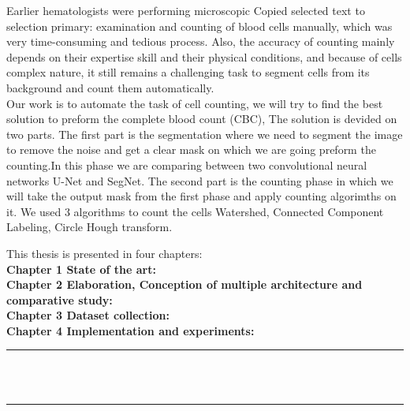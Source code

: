 \documentclass[12pt]{report}
\begin{document}
Earlier hematologists were performing microscopic Copied selected text to selection primary: examination and counting of blood cells manually, which  was very time-consuming and tedious process. Also, the accuracy of counting mainly depends on their expertise skill and their physical conditions, and because of cells complex nature, it still remains a challenging task to segment cells from its background and count them automatically.\\
Our work is to automate the task of cell counting, we will  try to find the best solution to preform the complete blood count (CBC), The solution is devided on two parts.
The first part is the segmentation where we need to segment the image to remove the noise and get a clear mask on which we are going preform the counting.In this phase we are comparing between two convolutional neural networks U-Net and SegNet.
The second part is the counting phase in which we will take  the output mask from the first phase and apply counting algorimths on it. We used 3 algorithms to count the cells Watershed, Connected Component Labeling, Circle Hough transform.

This thesis is presented in four chapters:\\

\textbf{Chapter 1 State of the art:}\\
\textbf{Chapter 2 Elaboration, Conception of multiple architecture and comparative study:}\\
\textbf{Chapter 3 Dataset collection:}\\
\textbf{Chapter 4 Implementation and experiments:}\\

\newpage

\vspace*{\fill}
\begin{center}
    {\color{Black} \rule{\linewidth}{1.2mm} }\\
\vspace{0.25in}
{\centering{}}
\vspace{0.35in}\\
    {\color{Black} \rule{\linewidth}{1.2mm} }
\end{center}
\vspace*{\fill}
\setcounter{section}{0}

\newpage
\end{document}
